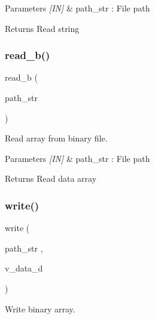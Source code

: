 \begin{DoxyParams}{Parameters}
{\em \mbox{[}\+I\+N\mbox{]}} & path\+\_\+str \+: File path \\
\hline
\end{DoxyParams}
\begin{DoxyReturn}{Returns}
Read string 
\end{DoxyReturn}
\mbox{\label{classfile_a68c4cc92742b766d90aa7ec340a680a0}} 
\subsubsection{read\_b()}
{\footnotesize\ttfamily read\+\_\+b (\begin{DoxyParamCaption}\item[{path\+\_\+str}]{ }\end{DoxyParamCaption})}



Read array from binary file. 


\begin{DoxyCode}{0}
\end{DoxyCode}



\begin{DoxyParams}{Parameters}
{\em \mbox{[}\+I\+N\mbox{]}} & path\+\_\+str \+: File path \\
\hline
\end{DoxyParams}
\begin{DoxyReturn}{Returns}
Read data array 
\end{DoxyReturn}
\mbox{\label{classfile_aef7a3e8afdf710c845a0cd9461dc0263}} 
\subsubsection{write()\hspace{0.1cm}{\footnotesize\ttfamily [1/2]}}
{\footnotesize\ttfamily write (\begin{DoxyParamCaption}\item[{path\+\_\+str}]{,  }\item[{v\+\_\+data\+\_\+d}]{ }\end{DoxyParamCaption})}



Write binary array. 


